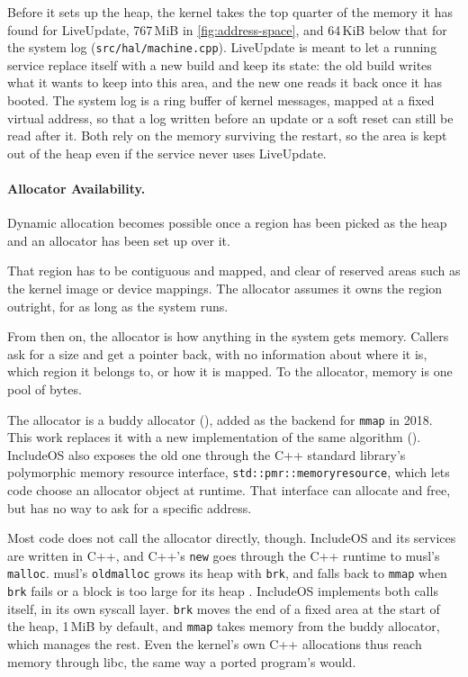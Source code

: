 \documentclass[12pt]{report}
\newcommand{\fullref}[1]{\Cref{#1}}
\renewcommand{\_}{\origunderscore\allowbreak}
\begin{document}
Before it sets up the heap, the kernel takes the top quarter of the memory it has found for LiveUpdate, 767\,MiB in \cref{fig:address-space}, and 64\,KiB below that for the system log (\texttt{src/hal/machine.cpp}). LiveUpdate is meant to let a running service replace itself with a new build and keep its state: the old build writes what it wants to keep into this area, and the new one reads it back once it has booted. The system log is a ring buffer of kernel messages, mapped at a fixed virtual address, so that a log written before an update or a soft reset can still be read after it. Both rely on the memory surviving the restart, so the area is kept out of the heap even if the service never uses LiveUpdate.

\paragraph{Allocator Availability.}

Dynamic allocation becomes possible once a region has been picked as the heap and an allocator has been set up over it.

That region has to be contiguous and mapped, and clear of reserved areas such as the kernel image or device mappings. The allocator assumes it owns the region outright, for as long as the system runs.

From then on, the allocator is how anything in the system gets memory. Callers ask for a size and get a pointer back, with no information about where it is, which region it belongs to, or how it is mapped. To the allocator, memory is one pool of bytes.

The allocator is a buddy allocator (\fullref{sec:memory-allocation}), added as the backend for \texttt{mmap} in 2018. This work replaces it with a new implementation of the same algorithm (\fullref{sec:allocator-interface}). IncludeOS also exposes the old one through the C++ standard library's polymorphic memory resource interface, \texttt{std::pmr::memory\_resource}, which lets code choose an allocator object at runtime. That interface can allocate and free, but has no way to ask for a specific address.

Most code does not call the allocator directly, though. IncludeOS and its services are written in C++, and C++'s \texttt{new} goes through the C++ runtime to musl's \texttt{malloc}. musl's \texttt{oldmalloc} grows its heap with \texttt{brk}, and falls back to \texttt{mmap} when \texttt{brk} fails or a block is too large for its heap \cite{musl-oldmalloc-source}. IncludeOS implements both calls itself, in its own syscall layer. \texttt{brk} moves the end of a fixed area at the start of the heap, 1\,MiB by default, and \texttt{mmap} takes memory from the buddy allocator, which manages the rest. Even the kernel's own C++ allocations thus reach memory through libc, the same way a ported program's would.
\end{document}

